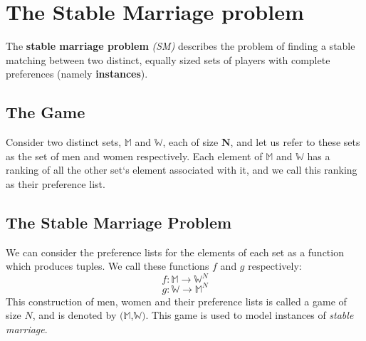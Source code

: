 \section{The Stable Marriage problem}
The \textbf{stable marriage problem} \textit{(SM)} describes the problem of finding a stable matching between two distinct, equally sized sets of players with complete preferences (namely \textbf{instances})\cite{gusfield_irving_1989}.
 
\subsection{The Game}
Consider two distinct sets, $\mathbb{M}$ and $\mathbb{W}$, each of size $\mathbf{N}$, and let us refer to these sets as the set of men and women respectively. Each element of $\mathbb{M}$ and $\mathbb{W}$ has a ranking of all the other set`s element associated with it, and we call this ranking as their preference list.
 
 

\subsection{The Stable Marriage Problem }
We can consider the preference lists for the elements of each set as a function which produces tuples. We call these functions $f$ and $g$ respectively:
$$f:\mathbb{M} \longrightarrow \mathbb{W}^N$$
$$g:\mathbb{W} \longrightarrow \mathbb{M}^N$$
This construction of men, women and their preference lists is called a game of size $N$, and is denoted by $(\mathbb{M}$,$\mathbb{W})$. This game is used to model instances of \textit{stable marriage}.
 

